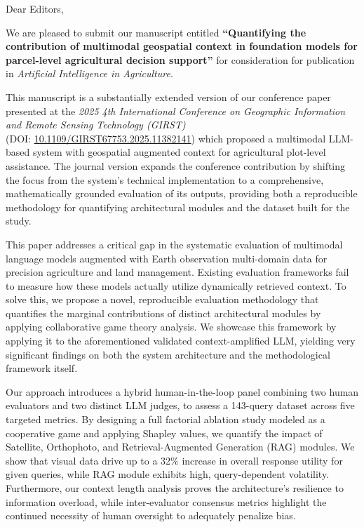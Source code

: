 \documentclass[a4paper,11pt]{letter}
\begin{document}
\normalsize Dear Editors,

\small \noindent
We are pleased to submit our manuscript entitled \textbf{``Quantifying the contribution of multimodal geospatial context in foundation models for parcel-level agricultural decision support''} for consideration for publication in \textit{Artificial Intelligence in Agriculture}.

\vspace{1pt}
This manuscript is a substantially extended version of our conference paper presented at the \textit{2025 4th International Conference on Geographic Information and Remote Sensing Technology (GIRST)}\\
(DOI: \href{http://dx.doi.org/10.1109/GIRST67753.2025.11382141}{10.1109/GIRST67753.2025.11382141}) which proposed a multimodal LLM-based system with geospatial augmented context for agricultural plot-level assistance. The journal version expands the conference contribution by shifting the focus from the system's technical implementation to a comprehensive, mathematically grounded evaluation of its outputs, providing both a reproducible methodology for quantifying architectural modules and the dataset built for the study.

\vspace{1pt}
This paper addresses a critical gap in the systematic evaluation of multimodal language models augmented with Earth observation multi-domain data for precision agriculture and land management. Existing evaluation frameworks fail to measure how these models actually utilize dynamically retrieved context. To solve this, we propose a novel, reproducible evaluation methodology that quantifies the marginal contributions of distinct architectural modules by applying collaborative game theory analysis. We showcase this framework by applying it to the aforementioned validated context-amplified LLM, yielding very significant findings on both the system architecture and the methodological framework itself. 

\vspace{1pt}
Our approach introduces a hybrid human-in-the-loop panel combining two human evaluators and two distinct LLM judges, to assess a 143-query dataset across five targeted metrics. By designing a full factorial ablation study modeled as a cooperative game and applying Shapley values, we quantify the impact of Satellite, Orthophoto, and Retrieval-Augmented Generation (RAG) modules. We show that visual data drive up to a 32$\%$ increase in overall response utility for given queries, while RAG module exhibits high, query-dependent volatility. Furthermore, our context length analysis proves the architecture's resilience to information overload, while inter-evaluator consensus metrics highlight the continued necessity of human oversight to adequately penalize bias.
\end{document}
